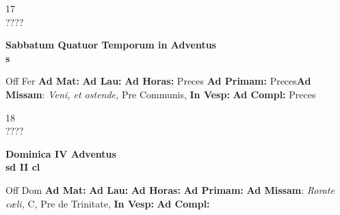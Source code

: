 \documentclass[10pt, openany]{book}
\begin{document}
    \begin{center}
        \begin{minipage}{3.5in}
            \vspace{2em}
            \begin{minipage}{0.5in}
                {\Huge 17} \\
                {\normalsize ????}
            \end{minipage}
            \begin{minipage}{3.0in}
                \textbf{ \large Sabbatum Quatuor Temporum in Adventus \\
                \textnormal{\normalsize s}}

            \end{minipage}
            \begin{justify}Off Fer
                \textbf{Ad Mat: }
                \textbf{Ad Lau: }
                \textbf{Ad Horas: }Preces
                \textbf{Ad Primam: }Preces\textbf{Ad Missam}: \textit{Veni, et ostende,} Pre Communis, 
                \textbf{In Vesp: }
                \textbf{Ad Compl: }Preces
            \end{justify}
        \end{minipage}
    \end{center}

    \begin{center}
        \begin{minipage}{3.5in}
            \vspace{2em}
            \begin{minipage}{0.5in}
                {\Huge 18} \\
                {\normalsize ????}
            \end{minipage}
            \begin{minipage}{3.0in}
                \textbf{ \large Dominica IV Adventus \\
                \textnormal{\normalsize sd II cl}}

            \end{minipage}
            \begin{justify}Off Dom
                \textbf{Ad Mat: }
                \textbf{Ad Lau: }
                \textbf{Ad Horas: }
                \textbf{Ad Primam: }\textbf{Ad Missam}: \textit{Rorate cæli,} C, Pre de Trinitate, 
                \textbf{In Vesp: }
                \textbf{Ad Compl: }
            \end{justify}
        \end{minipage}
    \end{center}
\end{document}
